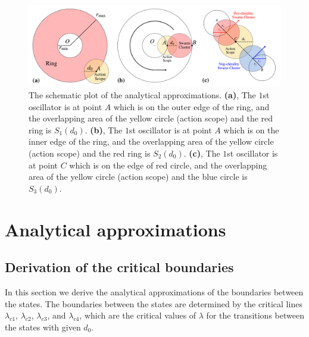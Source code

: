 \documentclass[%
 aip,
 amsmath,amssymb,
 reprint,%
]{revtex4-1}
\begin{document}
\begin{figure}
    \includegraphics[width=\textwidth]{./figs/analyticalEps.pdf}
    \caption{
        \label{fig:analyticalEps}
        The schematic plot of the analytical approximations.
        \textbf{(a)}, The $1$st oscillator is at point $A$ which is on the outer edge of the ring, and the overlapping area of the yellow circle (action scope) and the red ring is $S_1\left( d_0 \right)$.
        \textbf{(b)}, The $1$st oscillator is at point $A$ which is on the inner edge of the ring, and the overlapping area of the yellow circle (action scope) and the red ring is $S_2\left( d_0 \right)$.
        \textbf{(c)}, The $1$st oscillator is at point $C$ which is on the edge of red circle, and the overlapping area of the yellow circle (action scope) and the blue circle is $S_3\left( d_0 \right)$.
    }
\end{figure}

\section{\label{sec:analysis}Analytical approximations}

\subsection{\label{critical} Derivation of the critical boundaries}

In this section we derive the analytical approximations of the boundaries between the states. 
The boundaries between the states are determined by the critical lines $\lambda_{c1}$, $\lambda_{c2}$, $\lambda_{c3}$, and $\lambda_{c4}$, which are the critical values of $\lambda$ for the transitions between the states with given $d_0$.
\end{document}
